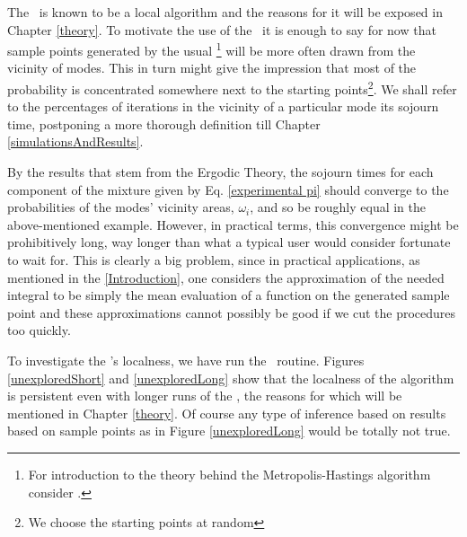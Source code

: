 \documentclass{book}
\begin{document}
The \MH\, is known to be a local algorithm and the reasons for it will be exposed in Chapter \ref{theory}. To motivate the use of the \PT\, it is enough to say for now that sample points generated by the usual \MH\footnote{For introduction to the theory behind the Metropolis-Hastings algorithm consider \cite{CharlesJ.Geyer}.} will be more often drawn from the vicinity of modes. This in turn might give the impression that most of the probability is concentrated somewhere next to the starting points\footnote{We choose the starting points at random}. We shall refer to the percentages of iterations in the vicinity of a particular mode its sojourn time, postponing a more thorough definition till Chapter \ref{simulationsAndResults}. 

By the results that stem from the Ergodic Theory, the sojourn times for each component of the mixture given by Eq. \ref{experimental pi} should converge to the probabilities of the modes' vicinity areas, $\omega_i$, and so be roughly equal in the above-mentioned example. However, in practical terms, this convergence might be prohibitively long, way longer than what a typical user would consider fortunate to wait for. This is clearly a big problem, since in practical applications, as mentioned in the \ref{Introduction}, one considers the approximation of the needed integral to be simply the mean evaluation of a function on the generated sample point and these approximations cannot possibly be good if we cut the procedures too quickly. 

To investigate the \MH's localness, we have run the \Metro\, routine. Figures \ref{unexploredShort} and \ref{unexploredLong} show that the localness of the algorithm is persistent even with longer runs of the \MH, the reasons for which will be mentioned in Chapter \ref{theory}. Of course any type of inference based on results based on sample points as in Figure \ref{unexploredLong} would be totally not true.  
\end{document}
